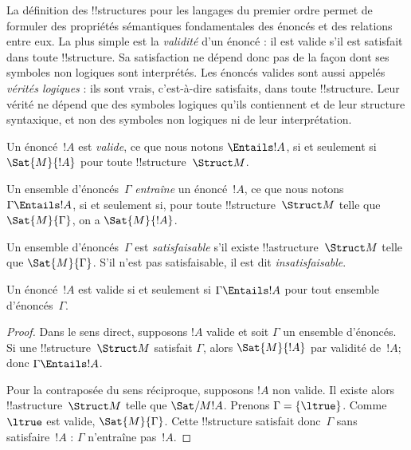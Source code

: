 \documentclass[../../../include/open-logic-section]{subfiles}
\begin{document}

\begin{explain}
La définition des !!{structure}s pour les langages du premier ordre
permet de formuler des propriétés sémantiques fondamentales des
énoncés et des relations entre eux. La plus simple est la
\emph{validité} d'un énoncé : il est valide s'il est satisfait dans
toute !!{structure}. Sa satisfaction ne dépend donc pas de la façon
dont ses symboles non logiques sont interprétés. Les énoncés valides
sont aussi appelés \emph{vérités logiques} : ils sont vrais,
c'est-à-dire satisfaits, dans toute !!{structure}. Leur vérité
ne dépend que des symboles logiques qu'ils contiennent et de leur
structure syntaxique, et non des symboles non logiques ni de leur
interprétation.
\end{explain}

\begin{defn}[Validité]
Un énoncé~$!A$ est \emph{valide}, ce que nous notons $\Entails !A$,
si et seulement si $\Sat{M}{!A}$ pour toute
!!{structure}~$\Struct M$.
\end{defn}

\begin{defn}
Un ensemble d'énoncés~$\Gamma$ \emph{entraîne} un énoncé~$!A$,
ce que nous notons $\Gamma \Entails !A$, si et seulement si, pour
toute !!{structure}~$\Struct M$ telle que $\Sat{M}{\Gamma}$,
on a $\Sat{M}{!A}$.
\end{defn}


\begin{defn}[Satisfaisabilité]
Un ensemble d'énoncés~$\Gamma$ est \emph{satisfaisable} s'il existe
!!a{structure}~$\Struct M$ telle que $\Sat{M}{\Gamma}$. S'il n'est
pas satisfaisable, il est dit \emph{insatisfaisable}.
\end{defn}

\begin{prop}
Un énoncé~$!A$ est valide si et seulement si
$\Gamma \Entails !A$ pour tout ensemble d'énoncés~$\Gamma$.
\end{prop}

\begin{proof}
Dans le sens direct, supposons $!A$ valide et soit $\Gamma$ un
ensemble d'énoncés. Si une !!{structure}~$\Struct M$ satisfait
$\Gamma$, alors $\Sat{M}{!A}$ par validité de~$!A$; donc
$\Gamma \Entails !A$.

Pour la contraposée du sens réciproque, supposons $!A$ non valide.
Il existe alors !!a{structure}~$\Struct M$ telle que
$\Sat/{M}{!A}$. Prenons $\Gamma = \{ \ltrue \}$. Comme
$\ltrue$ est valide, $\Sat{M}{\Gamma}$. Cette !!{structure}
satisfait donc~$\Gamma$ sans satisfaire~$!A$ :
$\Gamma$ n'entraîne pas~$!A$.
\end{proof}
\end{document}
